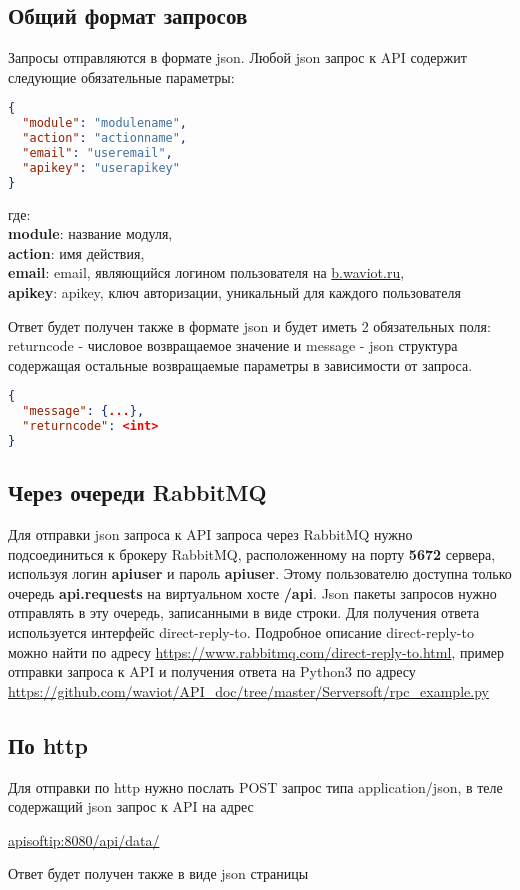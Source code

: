 \subsection{Общий формат запросов}
\label{subsec:common_format}

Запросы отправляются в формате json. Любой json запрос к API содержит следующие обязательные параметры:

\bigskip

\begin{lstlisting}[language=json,firstnumber=1]
{
  "module": "modulename",
  "action": "actionname",
  "email": "useremail",
  "apikey": "userapikey"
}
\end{lstlisting}

\smallskip

где: \\
\textbf{module}: название модуля, \\
\textbf{action}: имя действия, \\
\textbf{email}: email, являющийся логином пользователя на \url{b.waviot.ru}, \\
\textbf{apikey}: apikey, ключ авторизации, уникальный для каждого пользователя \\

\smallskip

Ответ будет получен также в формате json и будет иметь 2 обязательных поля: returncode - числовое возвращаемое значение и message - json структура содержащая остальные возвращаемые параметры в зависимости от запроса.

\begin{lstlisting}[language=json,firstnumber=1]
{
  "message": {...},
  "returncode": <int>
}
\end{lstlisting}

\subsection{Через очереди RabbitMQ}

\smallskip

Для отправки json запроса к API запроса через RabbitMQ нужно подсоединиться к брокеру RabbitMQ, расположенному на порту \textbf{5672} сервера, используя логин \textbf{apiuser} и пароль \textbf{apiuser}. Этому пользователю доступна только очередь \textbf{api.requests} на виртуальном хосте \textbf{/api}. Json пакеты запросов нужно отправлять в эту очередь, записанными в виде строки. Для получения ответа используется интерфейс direct-reply-to. Подробное описание direct-reply-to можно найти по адресу \url{https://www.rabbitmq.com/direct-reply-to.html}, пример отправки запроса к API и получения ответа на Python3 по адресу \url{https://github.com/waviot/API_doc/tree/master/Serversoft/rpc_example.py}

\subsection{По http}

Для отправки по http нужно послать POST запрос типа application/json, в теле содержащий json запрос к API на адрес

\smallskip

\url{apisoftip:8080/api/data/}

\smallskip

Ответ будет получен также в виде json страницы
